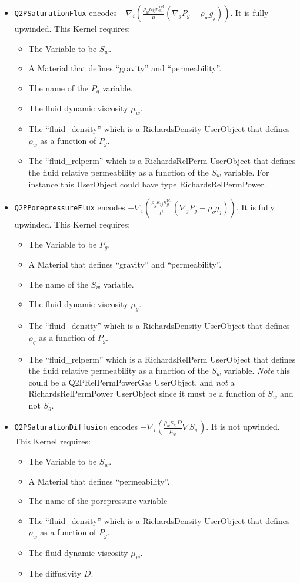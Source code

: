 \documentclass[]{scrreprt}
\begin{document}
\begin{itemize}
\item {\tt Q2PSaturationFlux} encodes $ - \nabla_{i}
\left( \frac{\rho_{w} \kappa_{ij}\kappa_{w}^{\mathrm{rel}}}{\mu}
(\nabla_{j}P_{g} - \rho_{w} g_{j}) \right)$.  It is fully upwinded.
This Kernel requires:
\begin{itemize}
\item The Variable to be $S_{w}$.
\item A Material that defines ``gravity'' and ``permeability''.
\item The name of the $P_{g}$ variable.
\item The fluid dynamic viscosity $\mu_{w}$.
\item The ``fluid\_density'' which is a RichardsDensity
  UserObject that defines $\rho_{w}$ as a function of $P_{g}$.
\item The ``fluid\_relperm'' which is a RichardsRelPerm UserObject that
  defines the fluid relative permeability as a function of the $S_{w}$
  variable.  For instance this UserObject could have type
  RichardsRelPermPower.
\end{itemize}

\item {\tt Q2PPorepressureFlux} encodes $ - \nabla_{i}
\left( \frac{\rho_{g} \kappa_{ij}\kappa_{g}^{\mathrm{rel}}}{\mu}
(\nabla_{j}P_{g} - \rho_{g} g_{j}) \right)$.  It is fully upwinded.
This Kernel requires:
\begin{itemize}
\item The Variable to be $P_{g}$.
\item A Material that defines ``gravity'' and ``permeability''.
\item The name of the $S_{w}$ variable.
\item The fluid dynamic viscosity $\mu_{g}$.
\item The ``fluid\_density'' which is a RichardsDensity
  UserObject that defines $\rho_{g}$ as a function of $P_{g}$.
\item The ``fluid\_relperm'' which is a RichardsRelPerm UserObject that
  defines the fluid relative permeability as a function of the $S_{w}$
  variable.  {\em Note} this could be a Q2PRelPermPowerGas UserObject,
  and {\em not} a RichardsRelPermPower UserObject since it must be a
  function of $S_{w}$ and {\em} not $S_{g}$.
\end{itemize}

\item {\tt Q2PSaturationDiffusion} encodes $- \nabla_{i}\left(
\frac{\rho_{w}\kappa_{ij}D}{\mu_{w}} \nabla S_{w} \right)$.  It is not
upwinded.  This Kernel requires:
\begin{itemize}
\item The Variable to be $S_{w}$.
\item A Material that defines ``permeability''.
\item The name of the porepressure variable
\item The ``fluid\_density'' which is a RichardsDensity
  UserObject that defines $\rho_{w}$ as a function of $P_{g}$.
\item The fluid dynamic viscosity $\mu_{w}$.
\item The diffusivity $D$.
\end{itemize}


\end{itemize}
\end{document}
